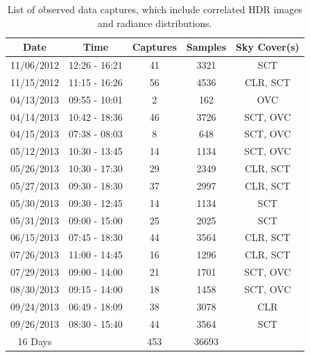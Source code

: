 \begin{table}[hbtp]
\caption{List of observed data captures, which include correlated HDR images and radiance distributions.}
\label{tab:ourdata}
\centering      
\begin{tabular}{ll*{3}{c}}
    \\
    \toprule
    \multicolumn{1}{c}{Date} & \multicolumn{1}{c}{Time} & Captures & Samples & Sky Cover(s) \\
    \midrule
    \rule[-1ex]{0pt}{3.5ex}  11/06/2012 & 12:26 - 16:21 & 41 & 3321 & SCT  \\
    \rule[-1ex]{0pt}{3.5ex}  11/15/2012 & 11:15 - 16:26 & 56 & 4536 & CLR, SCT  \\
    \rule[-1ex]{0pt}{3.5ex}  04/13/2013 & 09:55 - 10:01 & 2 & 162 & OVC  \\
    \rule[-1ex]{0pt}{3.5ex}  04/14/2013 & 10:42 - 18:36 & 46 & 3726 & SCT, OVC  \\
    \rule[-1ex]{0pt}{3.5ex}  04/15/2013 & 07:38 - 08:03 & 8 & 648 & SCT, OVC  \\
    \rule[-1ex]{0pt}{3.5ex}  05/12/2013 & 10:30 - 13:45 & 14 & 1134 & SCT, OVC  \\
    \rule[-1ex]{0pt}{3.5ex}  05/26/2013 & 10:30 - 17:30 & 29 & 2349 & CLR, SCT  \\
    \rule[-1ex]{0pt}{3.5ex}  05/27/2013 & 09:30 - 18:30 & 37 & 2997 & CLR, SCT  \\
    \rule[-1ex]{0pt}{3.5ex}  05/30/2013 & 09:30 - 12:45 & 14 & 1134 & SCT  \\
    \rule[-1ex]{0pt}{3.5ex}  05/31/2013 & 09:00 - 15:00 & 25 & 2025 & SCT  \\
    \rule[-1ex]{0pt}{3.5ex}  06/15/2013 & 07:45 - 18:30 & 44 & 3564 & CLR, SCT  \\
    \rule[-1ex]{0pt}{3.5ex}  07/26/2013 & 11:00 - 14:45 & 16 & 1296 & CLR, SCT  \\
    \rule[-1ex]{0pt}{3.5ex}  07/29/2013 & 09:00 - 14:00 & 21 & 1701 & SCT, OVC  \\
    \rule[-1ex]{0pt}{3.5ex}  08/30/2013 & 09:15 - 14:00 & 18 & 1458 & SCT, OVC  \\
    \rule[-1ex]{0pt}{3.5ex}  09/24/2013 & 06:49 - 18:09 & 38 & 3078 & CLR  \\
    \rule[-1ex]{0pt}{3.5ex}  09/26/2013 & 08:30 - 15:40 & 44 & 3564 & SCT  \\
    \midrule
    \multicolumn{1}{c}{16 Days} & & 453 & 36693 &  \\
    \bottomrule
\end{tabular}
\end{table}
